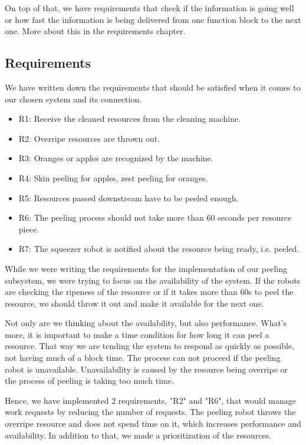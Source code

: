 \documentclass[conference]{IEEEtran}
\begin{document}
On top of that, we have requirements that check if the information is going well or how fast the information is being delivered from one function block to the next one. More about this in the requirements chapter. 
\subsection{Requirements}
\color{black}
We have written down the requirements that should be satisfied when it comes to our chosen system and its connection.
\begin{itemize}
    \item R1: Receive the cleaned resources from the cleaning machine. 
    \item R2: Overripe resources are thrown out. 
    \item R3: Oranges or apples are recognized by the machine.
    \item R4: Skin peeling for apples, zest peeling for oranges.
    \item R5: Resources passed downstream have to be peeled enough.
    \item R6: The peeling process should not take more than 60 seconds per resource piece.
    \item R7: The squeezer robot is notified about the resource being ready, i.e. peeled.
\end{itemize}


While we were writing the requirements for the implementation of our peeling subsystem, we were trying to focus on the availability of the system. If the robots are checking the ripeness of the resource or if it takes more than 60s to peel the resource, we should throw it out and make it available for the next one. 

Not only are we thinking about the availability, but also performance. What's more, it is important to make a time condition for how long it can peel a resource. That way we are tending the system to respond as quickly as possible, not having much of a block time. The process can not proceed if the peeling robot is unavailable. Unavailability is caused by the resource being overripe or the process of peeling is taking too much time. 

Hence, we have implemented 2 requirements, "R2" and "R6", that would manage work requests by reducing the number of requests. The peeling robot throws the overripe resource and does not spend time on it, which increases performance and availability. In addition to that, we made a prioritization of the resources. 
\end{document}

